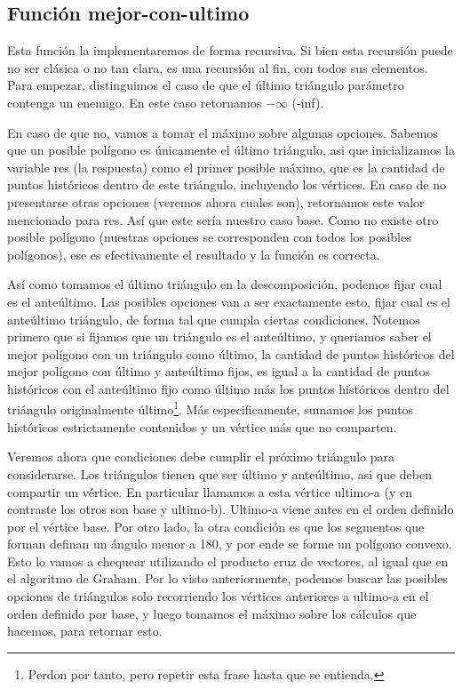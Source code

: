 \subsection{Función mejor-con-ultimo}
\par{Esta función la implementaremos de forma recursiva. Si bien esta recursión puede no ser clásica o no tan clara, es una recursión al fin, con todos sus elementos.
Para empezar, distinguimos el caso de que el último triángulo parámetro contenga un enemigo. En este caso retornamos $-\infty$ (-inf). }
\par{En caso de que no, vamos a tomar el máximo sobre algunas opciones. Sabemos que un posible polígono es únicamente el último triángulo, asi que inicializamos la variable res (la respuesta) como el primer posible máximo, que es la cantidad de puntos históricos dentro de este triángulo, incluyendo los vértices.
En caso de no presentarse otras opciones (veremos ahora cuales son), retornamos este valor mencionado para res. Así que este sería nuestro caso base. Como no existe otro posible polígono (nuestras opciones se corresponden con todos los posibles polígonos), ese es efectivamente el resultado y la función es correcta.}
\par{
Así como tomamos el último triángulo en la descomposición, podemos fijar cual es el anteúltimo.
Las posibles opciones van a ser exactamente esto, fijar cual es el anteúltimo triángulo, de forma tal que cumpla ciertas condiciones.
Notemos primero que si fijamos que un triángulo es el anteúltimo, y queriamos saber el mejor polígono con un triángulo como último, la cantidad de puntos históricos del mejor polígono con último y anteúltimo fijos, es igual a la cantidad de puntos históricos con el anteúltimo fijo como último más los puntos históricos dentro del triángulo originalmente último\footnote{Perdon por tanto, pero repetir esta frase hasta que se entienda.}. Más especificamente, sumamos los puntos históricos estrictamente contenidos y un vértice más que no comparten.
}
\par{Veremos ahora que condiciones debe cumplir el próximo triángulo para considerarse. Los triángulos tienen que ser último y anteúltimo, asi que deben compartir un vértice. En particular llamamos a esta vértice ultimo-a (y en contraste los otros son base y ultimo-b). Ultimo-a viene antes en el orden definido por el vértice base. Por otro lado, la otra condición es que los segmentos que forman definan un ángulo menor a 180, y por ende se forme un polígono convexo. Esto lo vamos a chequear utilizando el producto cruz de vectores, al igual que en el algoritmo de Graham. 
Por lo visto anteriormente, podemos buscar las posibles opciones de triángulos solo recorriendo los vértices anteriores a ultimo-a en el orden definido por base, y luego tomamos el máximo sobre los cálculos que hacemos, para retornar esto.}

